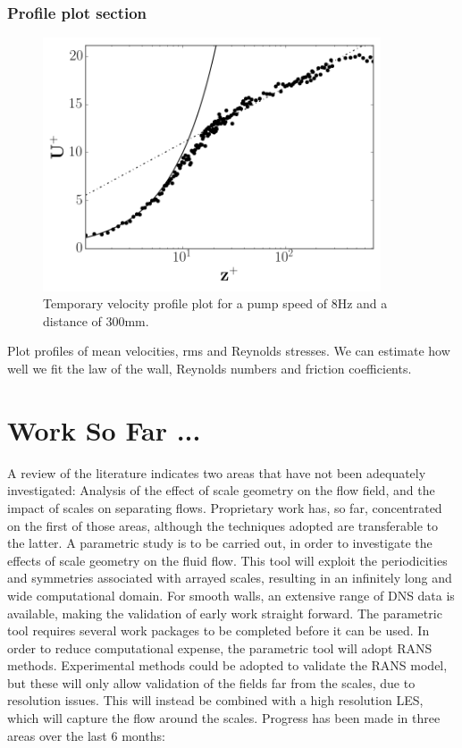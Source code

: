 \documentclass[12pt,oneside,a4paper]{article}
\begin{document}
\subsubsection{Profile plot section}
\begin{figure}
\centering
\includegraphics[width=10cm]{images/LDA_profileImages/tempProfile.png}
\caption{Temporary velocity profile plot for a pump speed of 8Hz and a distance of 300mm.}
\end{figure}
Plot profiles of mean velocities, rms and Reynolds stresses. We can estimate how well we fit the law of the wall, Reynolds numbers and friction coefficients. 
\section{Work So Far ...}
A review of the literature indicates two areas that have not been adequately investigated: Analysis of the effect of scale geometry on the flow field, and the impact of scales on separating flows. Proprietary work has, so far, concentrated on the first of those areas, although the techniques adopted are transferable to the latter. A parametric study is to be carried out, in order to investigate the effects of scale geometry on the fluid flow. This tool will exploit the periodicities and symmetries associated with arrayed scales, resulting in an infinitely long and wide computational domain. For smooth walls, an extensive range of DNS data is available, making the validation of early work straight forward. The parametric tool requires several work packages to be completed before it can be used. In order to reduce computational expense, the parametric tool will adopt RANS methods. Experimental methods could be adopted to validate the RANS model, but these will only allow validation of the fields far from the scales, due to resolution issues. This will instead be combined with a high resolution LES, which will capture the flow around the scales. Progress has been made in three areas over the last 6 months:
\end{document}
